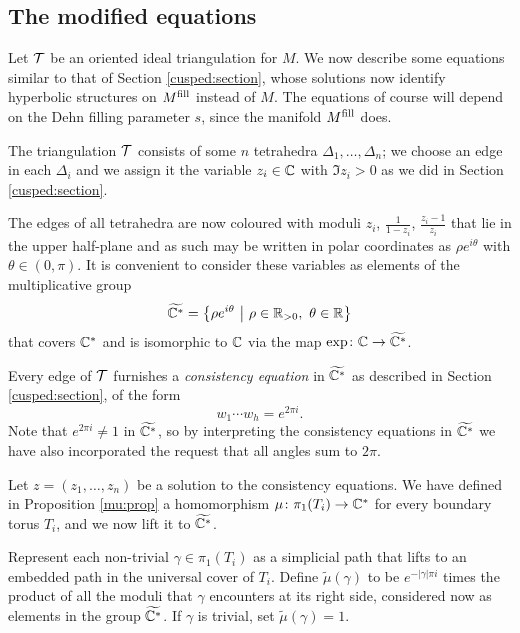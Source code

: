\subsection{The modified equations} \label{modified:equations:subsection}
Let $\mathcal{T}$ be an oriented ideal triangulation for $M$. We now describe some equations similar to that of Section \ref{cusped:section}, whose solutions now identify hyperbolic structures on $M^{\rm fill}$ instead of $M$. The equations of course will depend on the Dehn filling parameter $s$, since the manifold $M^{\rm fill}$ does.

The triangulation $\mathcal{T}$ consists of some $n$ tetrahedra $\Delta_1,\ldots, \Delta_n$; we choose an edge in each $\Delta_i$ and we assign it the variable $z_i\in \mathbb{C}$ with $\Im z_i >0$ as we did in Section \ref{cusped:section}.

The edges of all tetrahedra are now coloured with moduli $z_i$, $\frac 1{1-z_i}$, $\frac{z_i-1}{z_i}$ that lie in the upper half-plane and as such may be written in polar coordinates as $\rho e^{i\theta}$ with $\theta \in (0,\pi)$. It is convenient to consider these variables as elements of the multiplicative group
$$\widetilde{\mathbb{C}^*} = \big\{\rho e^{i\theta}\ \big| \ \rho \in \mathbb{R}_{>0},\ \theta \in \mathbb{R}\big\}$$
that covers $\mathbb{C}^*$ and is isomorphic to $\mathbb{C}$ via the map $\exp\colon \mathbb{C} \to \widetilde{\mathbb{C}^*}$. 

Every edge of $\mathcal{T}$ furnishes a \emph{consistency equation} in $\widetilde {\mathbb{C}^*}$ as described in Section \ref{cusped:section}, of the form
$$w_1\cdots w_h = e^{2 \pi i}.$$
Note that $e^{2 \pi i} \neq 1$ in $\widetilde{\mathbb{C}^*}$, so by interpreting the consistency equations in $\widetilde{\mathbb{C}^*}$ we have also incorporated the request that all angles sum to $2\pi$.

Let $z=(z_1,\ldots, z_n)$ be a solution to the consistency equations.
We have defined in Proposition \ref{mu:prop} a homomorphism $\mu\colon \pi_1(T_i) \to \mathbb{C}^*$ for every boundary torus $T_i$, and we now lift it to $\widetilde{\mathbb{C}^*}$. 

\begin{defn} \label{tilde:mu:defn}
Represent each non-trivial $\gamma \in \pi_1(T_i)$ as a simplicial path that lifts to an embedded path in the universal cover of $T_i$. Define $\tilde\mu(\gamma)$ to be $e^{-|\gamma| \pi i }$ times the product of all the moduli that $\gamma$ encounters at its right side, considered now as elements in the group $\widetilde{\mathbb{C}^*}$. If $\gamma$ is trivial, set $\tilde\mu(\gamma) = 1$.
\end{defn}

